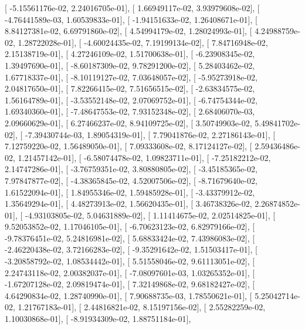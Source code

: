 \documentclass{article}
\begin{document}
       [ -5.15561176e-02,   2.24016705e-01],
       [  1.66949117e-02,   3.93979608e-02],
       [ -4.76441589e-03,   1.60539833e-01],
       [ -1.94151633e-02,   1.26408671e-01],
       [  8.84127381e-02,   6.69791860e-02],
       [  4.54994179e-02,   1.28024993e-01],
       [  4.24988759e-02,   1.28722028e-01],
       [ -4.60024435e-02,   7.19199134e-02],
       [  7.84716948e-02,   2.15138719e-01],
       [  4.27246109e-02,   1.51700638e-01],
       [ -6.23908345e-02,   1.39497690e-01],
       [ -8.60187309e-02,   9.78291200e-02],
       [  5.28403462e-02,   1.67718337e-01],
       [ -8.10119127e-02,   7.03648057e-02],
       [ -5.95273918e-02,   2.04817650e-01],
       [  7.82266415e-02,   7.51656515e-02],
       [ -2.63834575e-02,   1.56164789e-01],
       [ -3.53552148e-02,   2.07069752e-01],
       [ -6.74754344e-02,   1.69340360e-01],
       [ -7.48647553e-02,   7.93152348e-02],
       [  2.68406070e-03,   2.09660629e-01],
       [  6.27466237e-02,   8.94109725e-02],
       [  3.50749903e-02,   5.49841702e-02],
       [ -7.39430744e-03,   1.89054319e-01],
       [  7.79041876e-02,   2.27186143e-01],
       [  7.12759220e-02,   1.56489050e-01],
       [  7.09333608e-02,   8.17124127e-02],
       [  2.59436486e-02,   1.21457142e-01],
       [ -6.58074478e-02,   1.09823711e-01],
       [ -7.25182212e-02,   2.14747286e-01],
       [ -3.76759351e-02,   3.80880805e-02],
       [ -3.45185365e-02,   7.97847877e-02],
       [ -4.38365845e-02,   4.52007506e-02],
       [ -8.71679640e-02,   1.61522094e-01],
       [  1.84955346e-02,   1.59485928e-01],
       [ -3.43379912e-02,   1.35649294e-01],
       [  4.48273913e-02,   1.56620435e-01],
       [  3.46738326e-02,   2.26874852e-01],
       [ -4.93103805e-02,   5.04631889e-02],
       [  1.11414675e-02,   2.02514825e-01],
       [  9.52053852e-02,   1.17046105e-01],
       [ -6.70623123e-02,   6.82979166e-02],
       [ -9.78376451e-02,   5.24816981e-02],
       [  5.68833424e-02,   7.43986083e-02],
       [ -2.46220438e-02,   3.72166283e-02],
       [ -9.35291642e-02,   1.51503417e-01],
       [ -3.20858792e-02,   1.08534442e-01],
       [  5.51558046e-02,   9.61113051e-02],
       [  2.24743118e-02,   2.00382037e-01],
       [ -7.08097601e-03,   1.03265352e-01],
       [ -1.67207128e-02,   2.09819474e-01],
       [  7.32149868e-02,   9.68182427e-02],
       [  4.64290834e-02,   1.28740990e-01],
       [  7.90688735e-03,   1.78550621e-01],
       [  5.25042714e-02,   1.21767183e-01],
       [  2.44816821e-02,   8.15197156e-02],
       [  2.55282259e-02,   1.10030868e-01],
       [ -8.91934309e-02,   1.88751184e-01],
\end{document}
